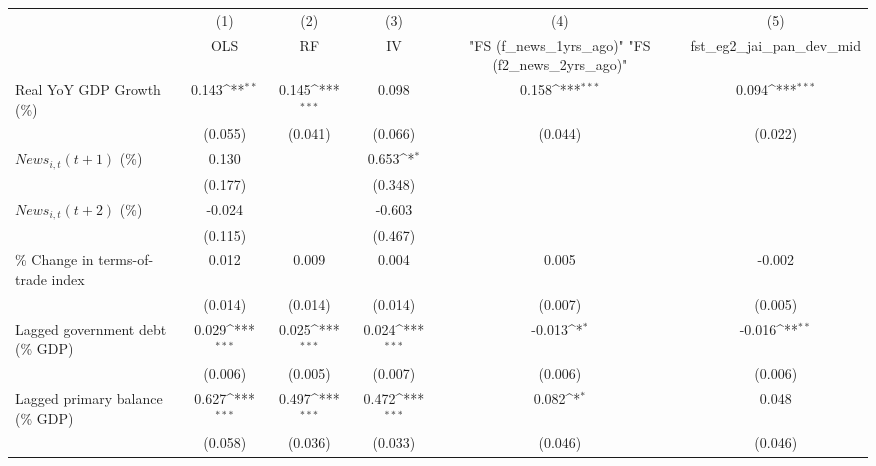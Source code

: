{
\def\sym#1{\ifmmode^{#1}\else\(^{#1}\)\fi}
\begin{tabular}{l*{5}{c}}
\toprule
                    &\multicolumn{1}{c}{(1)}&\multicolumn{1}{c}{(2)}&\multicolumn{1}{c}{(3)}&\multicolumn{1}{c}{(4)}&\multicolumn{1}{c}{(5)}\\
                    &\multicolumn{1}{c}{OLS}&\multicolumn{1}{c}{RF}&\multicolumn{1}{c}{IV}&\multicolumn{1}{c}{ "FS (f_news_1yrs_ago)"  "FS (f2_news_2yrs_ago)" }&\multicolumn{1}{c}{fst_eg2_jai_pan_dev_mid}\\
\midrule
Real YoY GDP Growth (\%)&       0.143\sym{**} &       0.145\sym{***}&       0.098         &       0.158\sym{***}&       0.094\sym{***}\\
                    &     (0.055)         &     (0.041)         &     (0.066)         &     (0.044)         &     (0.022)         \\
\addlinespace
$ News_{i,t}(t+1)$ (\%)&       0.130         &                     &       0.653\sym{*}  &                     &                     \\
                    &     (0.177)         &                     &     (0.348)         &                     &                     \\
\addlinespace
$ News_{i,t}(t+2)$ (\%)&      -0.024         &                     &      -0.603         &                     &                     \\
                    &     (0.115)         &                     &     (0.467)         &                     &                     \\
\addlinespace
\% Change in terms-of-trade index&       0.012         &       0.009         &       0.004         &       0.005         &      -0.002         \\
                    &     (0.014)         &     (0.014)         &     (0.014)         &     (0.007)         &     (0.005)         \\
\addlinespace
Lagged government debt (\% GDP)&       0.029\sym{***}&       0.025\sym{***}&       0.024\sym{***}&      -0.013\sym{*}  &      -0.016\sym{**} \\
                    &     (0.006)         &     (0.005)         &     (0.007)         &     (0.006)         &     (0.006)         \\
\addlinespace
Lagged primary balance (\% GDP)&       0.627\sym{***}&       0.497\sym{***}&       0.472\sym{***}&       0.082\sym{*}  &       0.048         \\
                    &     (0.058)         &     (0.036)         &     (0.033)         &     (0.046)         &     (0.046)         \\

\end{tabular}}
